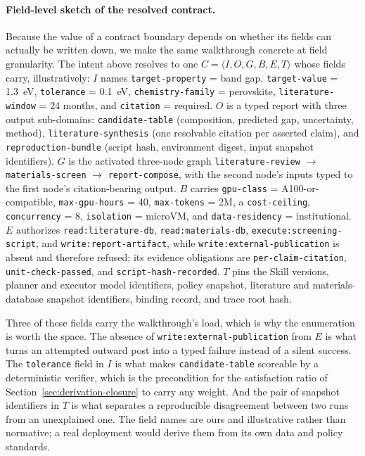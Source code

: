 \paragraph{Field-level sketch of the resolved contract.}
Because the value of a contract boundary depends on whether its fields can actually be written down, we make the same walkthrough concrete at field granularity. The intent above resolves to one $C=\langle I,O,G,B,E,T\rangle$ whose fields carry, illustratively: $I$ names \texttt{target-property} = band gap, \texttt{target-value} = 1.3~eV, \texttt{tolerance} = 0.1~eV, \texttt{chemistry-family} = perovskite, \texttt{literature-window} = 24 months, and \texttt{citation} = required. $O$ is a typed report with three output sub-domains: \texttt{candidate-table} (composition, predicted gap, uncertainty, method), \texttt{literature-synthesis} (one resolvable citation per asserted claim), and \texttt{reproduction-bundle} (script hash, environment digest, input snapshot identifiers). $G$ is the activated three-node graph \texttt{literature-review} $\rightarrow$ \texttt{materials-screen} $\rightarrow$ \texttt{report-compose}, with the second node's inputs typed to the first node's citation-bearing output. $B$ carries \texttt{gpu-class} = A100-or-compatible, \texttt{max-gpu-hours} = 40, \texttt{max-tokens} = 2M, a \texttt{cost-ceiling}, \texttt{concurrency} = 8, \texttt{isolation} = microVM, and \texttt{data-residency} = institutional. $E$ authorizes \texttt{read:literature-db}, \texttt{read:materials-db}, \texttt{execute:screening-script}, and \texttt{write:report-artifact}, while \texttt{write:external-publication} is absent and therefore refused; its evidence obligations are \texttt{per-claim-citation}, \texttt{unit-check-passed}, and \texttt{script-hash-recorded}. $T$ pins the Skill versions, planner and executor model identifiers, policy snapshot, literature and materials-database snapshot identifiers, binding record, and trace root hash.

Three of these fields carry the walkthrough's load, which is why the enumeration is worth the space. The absence of \texttt{write:external-publication} from $E$ is what turns an attempted outward post into a typed failure instead of a silent success. The \texttt{tolerance} field in $I$ is what makes \texttt{candidate-table} scoreable by a deterministic verifier, which is the precondition for the satisfaction ratio of Section~\ref{sec:derivation-closure} to carry any weight. And the pair of snapshot identifiers in $T$ is what separates a reproducible disagreement between two runs from an unexplained one. The field names are ours and illustrative rather than normative; a real deployment would derive them from its own data and policy standards.

